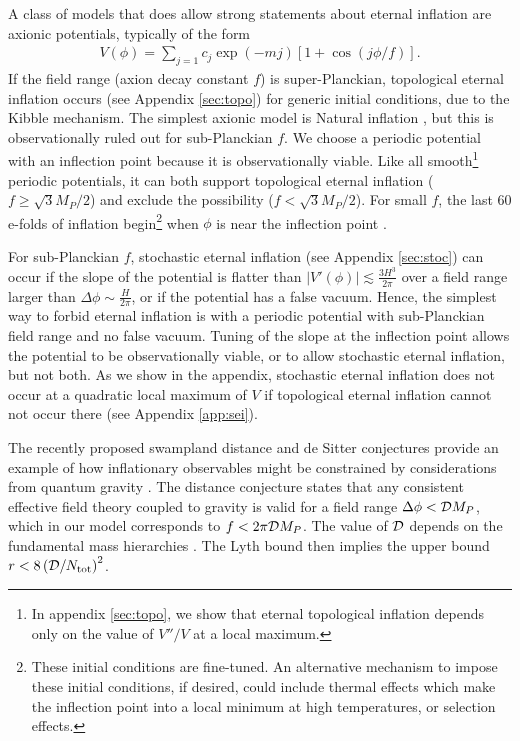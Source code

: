 \documentclass[aps,amsfonts,amsmath,prd,preprint,nofootinbib,superscriptaddress]{revtex4}
\newcommand{\Mp}{{M_{P}}}
\begin{document}
A class of models that does allow strong statements about eternal inflation are axionic potentials, typically of the form \cite{shiu}
\begin{align}
V(\phi) = \sum_{j=1} c_j \exp(- m j)\left[1 + \cos(j\phi/f)\right].
\end{align}
If the field range (axion decay constant $f$) is super-Planckian, topological 
eternal inflation \cite{Vilenkin:1994pv,Linde:1994wt} occurs (see Appendix \ref{sec:topo}) for generic initial conditions, due to the Kibble mechanism.  
The simplest axionic model is Natural inflation \cite{freese}, but this is observationally ruled out for sub-Planckian $f$.
We choose a periodic potential with an inflection point  because it is observationally viable.  
Like all smooth\footnote{In appendix \ref{sec:topo}, we show that eternal topological inflation depends only on the value of $V''/V$ at a local maximum.} periodic potentials,
it can both support topological eternal inflation ($f \geq \sqrt{3}\Mp/2$) and exclude the possibility ($f < \sqrt{3}\Mp/2$).  
For small $f$, the last $60$ e-folds of inflation begin\footnote{
	These initial conditions are fine-tuned.  An alternative mechanism to impose these initial conditions, if desired, could 
	include thermal effects which make the inflection point into a local minimum at high temperatures, or selection effects.}
when $\phi$ is near the inflection point \cite{Martin:2013tda, Allahverdi:2008bt, Hotchkiss:2011am,Musoke:2017frr}.



For sub-Planckian $f$, stochastic 
eternal inflation (see Appendix \ref{sec:stoc}) can occur if 
the slope of the potential is flatter than $\left|V'(\phi)\right| \lesssim \frac{3H^3}{2\pi}$ over a field range larger 
than $\Delta\phi \sim \frac{H}{2\pi}$, or if the potential has a false vacuum. 
Hence, the simplest way to forbid eternal inflation is with a periodic potential
with sub-Planckian field range and no false vacuum.  Tuning of the slope at the inflection point allows the potential to be observationally viable, 
or to allow stochastic eternal inflation, but not both.  As we show in the appendix, stochastic eternal inflation does not occur at a quadratic
local maximum of $V$ if topological eternal inflation cannot not occur there (see Appendix \ref{app:sei}).






The recently proposed swampland distance and de Sitter conjectures provide an example of how inflationary observables might be 
constrained by considerations from quantum gravity \cite{Brown:2015iha}.  The distance conjecture
states that any consistent effective field theory coupled to gravity is valid for a field range $\Delta\phi < {\cal D}\Mp$, which in our 
model corresponds to $f < 2\pi {\cal D}\Mp$.  The value of ${\cal D}$ depends on
the fundamental mass hierarchies \cite{Dias:2018ngv}.  The Lyth bound \cite{} then implies the upper bound $r < 8\left({\cal D}/N_{\rm tot}\right)^2$.
\end{document}
